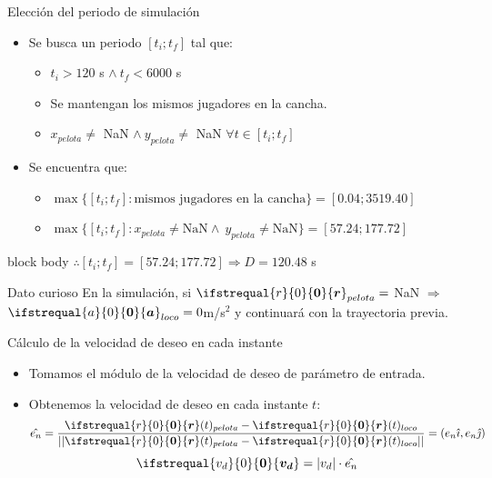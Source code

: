\documentclass{beamer}
\renewcommand\vec[1]{\ifstrequal{#1}{0}{\ensuremath{\mathbf{0}}}{\ensuremath{\boldsymbol{#1}}}}
\begin{document}
            \begin{frame}{Elección del periodo de simulación}
                \begin{itemize}
                    \item Se busca un periodo \alert{$[t_i ; t_f]$} tal que:
                    \begin{itemize}
                        \item $t_i > 120$ s $\land\ t_f < 6000$ s
                        \item Se mantengan los mismos jugadores en la cancha.
                        \item $x_{pelota} \ne$ NaN $\land\ y_{pelota} \ne$ NaN $\forall t \in [t_i ; t_f]$
                    \end{itemize}
                    \item Se encuentra que:
                    \begin{itemize}
                        \item $\max\{[t_i ; t_f] : \text{mismos jugadores en la cancha}\} = [0.04 ; 3519.40]$
                        \item $\max\{[t_i ; t_f] : x_{pelota} \ne \text{NaN} \land\ y_{pelota} \ne \text{NaN}\} = [57.24 ; 177.72]$
                    \end{itemize}
                \end{itemize}
                \begin{beamercolorbox}[sep=5pt,center]{block body}
                    \centering
                    $\therefore [t_i ; t_f] = [57.24 ; 177.72] \Rightarrow D = 120.48$ s
                \end{beamercolorbox}
                \begin{block}{Dato curioso}
                    En la simulación, si $\vec{r}_{pelota} =$ NaN $\Rightarrow$ $\vec{a}_{loco}=0$m/s$^2$ y continuará con la trayectoria previa.
                \end{block}
            \end{frame}

            \begin{frame}{Cálculo de la velocidad de deseo en cada instante}
                \begin{itemize}
                    \item Tomamos el módulo de la velocidad de deseo de parámetro de entrada.
                    \item Obtenemos la velocidad de deseo en cada instante $t$:
                        \begin{equation*}
                            \hat{e_n} = \frac{\vec{r}(t)_{pelota} - \vec{r}(t)_{loco}}{||\vec{r}(t)_{pelota} - \vec{r}(t)_{loco}||}= (e_n \hat{\imath}, e_n \hat{\jmath})
                        \end{equation*}
                        \begin{equation*}
                            \vec{v_d} = |v_d| \cdot \hat{e_n}
                        \end{equation*}
                \end{itemize}
            \end{frame}
\end{document}
